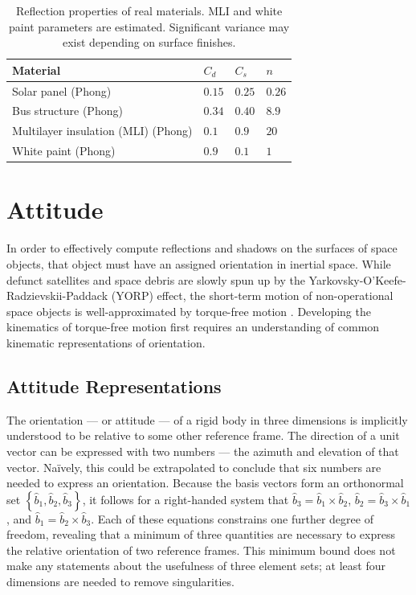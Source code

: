 \begin{table}[]
  \centering
  \begin{tabular}{|l|l|l|l|}
  \hline
  \textbf{Material} & $C_d$ & $C_s$ & $n$ \\ \hline
  Solar panel (Phong) \cite{fankhauser2023}              & $0.15$ & $0.25$ & $0.26$  \\ \hline
  Bus structure (Phong) \cite{fankhauser2023}               & $0.34$ & $0.40$ & $8.9$  \\ \hline
  Multilayer insulation (MLI) (Phong) & $0.1$ & $0.9$ & $20$ \\ \hline
  White paint (Phong) & $0.9$ & $0.1$ & $1$ \\ \hline
  \end{tabular}
  \caption{Reflection properties of real materials. MLI and white paint parameters are estimated. Significant variance may exist depending on surface finishes.}
  \label{tb:real_matprops}
\end{table}

\section{Attitude}

In order to effectively compute reflections and shadows on the surfaces of space objects, that object must have an assigned orientation in inertial space. While defunct satellites and space debris are slowly spun up by the Yarkovsky-O'Keefe-Radzievskii-Paddack (YORP) effect, the short-term motion of non-operational space objects is well-approximated by torque-free motion \cite{benson2018cyclic}. Developing the kinematics of torque-free motion first requires an understanding of common kinematic representations of orientation.

\subsection{Attitude Representations}

The orientation --- or attitude --- of a rigid body in three dimensions is implicitly understood to be relative to some other reference frame. The direction of a unit vector can be expressed with two numbers ---  the azimuth and elevation of that vector. Naïvely, this could be extrapolated to conclude that six numbers are needed to express an orientation. Because the basis vectors form an orthonormal set $\left\{ \hat{b}_1, \hat{b}_2, \hat{b}_3\right\}$, it follows for a right-handed system that $\hat{b}_3 = \hat{b}_1 \times \hat{b}_2$, $\hat{b}_2 = \hat{b}_3 \times \hat{b}_1$, and $\hat{b}_1 = \hat{b}_2 \times \hat{b}_3$. Each of these equations constrains one further degree of freedom, revealing that a minimum of three quantities are necessary to express the relative orientation of two reference frames. This minimum bound does not make any statements about the usefulness of three element sets; at least four dimensions are needed to remove singularities. 

